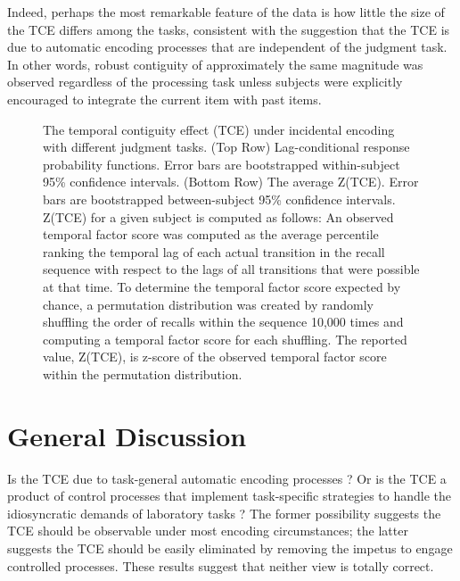 \documentclass[man,natbib,floatsintext]{apa6} %
\begin{document}
Indeed, perhaps the most remarkable feature of the data is how little the size of the TCE differs among the tasks, consistent with the suggestion that the TCE is due to automatic encoding processes that are independent of the judgment task. %
In other words, robust contiguity of approximately the same magnitude was observed regardless of the processing task unless subjects were explicitly encouraged to integrate the current item with past items.

\begin{figure}%
\caption{The temporal contiguity effect (TCE) under incidental encoding with different judgment tasks. (Top Row) Lag-conditional response probability functions. Error bars are bootstrapped within-subject 95\% confidence intervals. (Bottom Row) The average Z(TCE).  Error bars are bootstrapped between-subject 95\% confidence intervals. Z(TCE) for a given subject is computed as follows: An observed temporal factor score was computed as the average percentile ranking the temporal lag of each actual transition in the recall sequence with respect to the lags of all transitions that were possible at that time. To determine the temporal factor score expected by chance, a permutation distribution was created by randomly shuffling the order of recalls within the sequence 10,000 times and computing a temporal factor score for each shuffling. The reported value, Z(TCE), is z-score of the observed temporal factor score within the permutation distribution.}
\label{E3}
\end{figure}

\section{General Discussion}
Is the TCE due to task-general automatic encoding processes \citep{HealEtal14}? Or is the TCE a product of control processes that implement task-specific strategies to handle the idiosyncratic demands of laboratory tasks \citep{Hint16}? The former possibility suggests the TCE should be observable under most encoding circumstances; the latter suggests the TCE should be easily eliminated by removing the impetus to engage controlled processes. These results suggest that neither view is totally correct.
\end{document}
